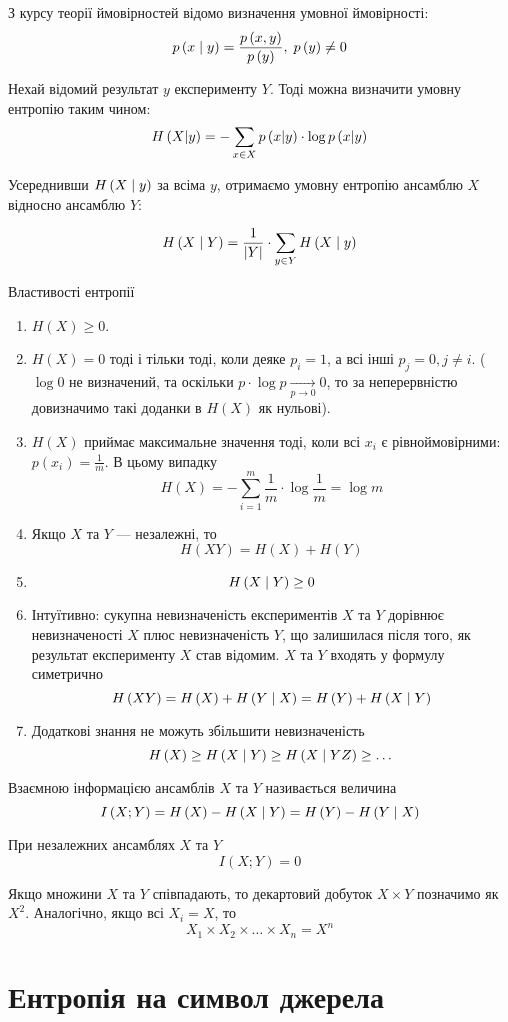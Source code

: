 З курсу теорії ймовірностей відомо визначення умовної ймовірності:
$$p\left(x \;\middle|\; y\right) = \frac{p\left(x,y\right)}{p\left(y\right)},\; p\left(y\right)\neq 0$$

Нехай відомий результат $y$ експерименту $Y$. Тоді можна визначити умовну
ентропію таким чином:
$$H\left(X|y\right) = -\sum_{x\in X} p\left(x|y\right) \cdot \log p\left(x|y\right)$$

Усереднивши  $H\left( X \;\middle|\; y \right)$ за всіма  $y$,
отримаємо умовну ентропію ансамблю $X$ відносно ансамблю $Y$:

$$H\left( X \;\middle|\; Y \right)
    = \frac{1}{\left| Y \right|}
        \cdot \sum_{y \in Y} H\left( X \;\middle|\; y \right)$$

Властивості ентропії
\begin{enumerate}
    \item  $H\left( X \right) \ge 0$.
    \item  $H(X)=0$ тоді і тільки тоді, коли деяке  $p_i=1$, а всі інші 
        $p_j=0,j\neq i$. ($\log{0}$ не визначений, та оскільки  $p\cdot
        \log{p} \xrightarrow[p \to 0]{} 0$, то за неперервністю
        довизначимо такі доданки в $H\left( X \right)$ як нульові).
    \item $H\left( X \right)$ приймає максимальне значення тоді,
        коли всі $x_i$ є рівноймовірними:
        $p\left( x_i \right) = \frac{1}{m}$. В цьому випадку
        $$H\left( X \right)
            = -\sum_{i=1}^m \frac{1}{m} \cdot \log{\frac{1}{m}}
            =\log{m}$$
    \item Якщо $X$ та $Y$ --- незалежні, то
        $$H\left( XY \right) = H\left( X \right) + H\left( Y \right)$$
    \item $$H\left( X \;\middle|\; Y \right)\ge 0$$
    \item Інтуїтивно: сукупна невизначеність експериментів $X$ та $Y$
        дорівнює невизначеності $X$ плюс невизначеність $Y$, що
        залишилася після того, як результат експерименту $X$ став відомим.
        $X$ та $Y$ входять у формулу симетрично
        $$H\left( XY \right)
            = H\left( X \right)+H\left( Y \;\middle|\; X \right)
            = H\left( Y \right)+H\left( X \;\middle|\; Y \right)$$
    \item Додаткові знання не можуть збільшити невизначеність
        $$H\left( X \right)
            \ge H\left( X \;\middle|\; Y \right)
            \ge H\left( X \;\middle|\; YZ \right)
            \ge \dots$$
\end{enumerate}

\begin{definition}
    Взаємною інформацією ансамблів $X$ та $Y$ називається величина 
    $$I\left( X; Y \right)
        = H\left( X \right)-H\left( X \;\middle|\; Y \right)
        = H\left( Y \right)-H\left( Y \;\middle|\; X \right)$$

    При незалежних ансамблях $X$ та $Y$
    $$I\left( X; Y \right) = 0$$
\end{definition}

Якщо множини $X$ та $Y$ співпадають, то декартовий добуток
$X \times Y$ позначимо як  $X^2$.
Аналогічно, якщо всі $X_i=X$, то
$$X_1 \times X_2 \times \dots \times X_n=X^n$$

\section{Ентропія на символ джерела}
